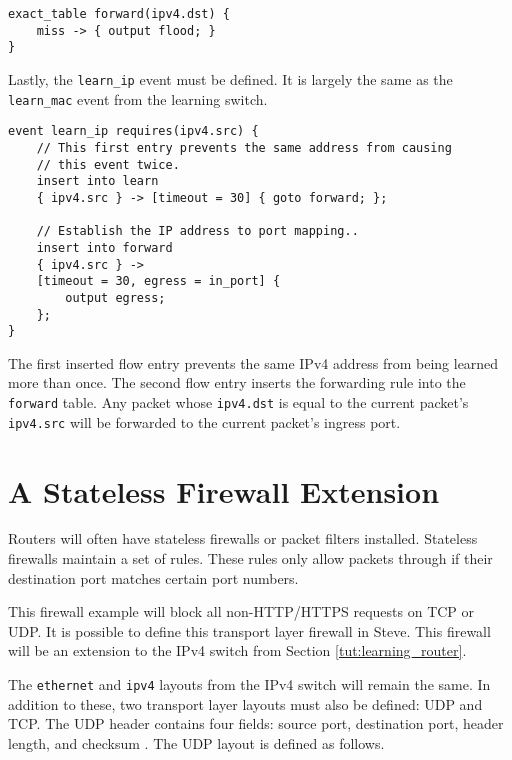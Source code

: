 \begin{codepage}
\begin{lstlisting}
exact_table forward(ipv4.dst) {
	miss -> { output flood; }
}
\end{lstlisting}
\end{codepage}

Lastly, the \texttt{learn\_ip} event must be defined. It is
largely the same as the \texttt{learn\_mac} event from the learning switch.

\begin{codepage}
\begin{lstlisting}
event learn_ip requires(ipv4.src) {
	// This first entry prevents the same address from causing
	// this event twice.
	insert into learn
	{ ipv4.src } -> [timeout = 30] { goto forward; };

	// Establish the IP address to port mapping..
	insert into forward
	{ ipv4.src } ->
	[timeout = 30, egress = in_port] {
		output egress;
	};
}
\end{lstlisting}
\end{codepage}

The first inserted flow entry prevents the same IPv4 address from being learned
more than once. The second flow entry inserts the forwarding rule into the
\texttt{forward} table. Any packet whose \texttt{ipv4.dst} is equal to the current
packet's \texttt{ipv4.src} will be forwarded to the current packet's ingress
port.

\section{A Stateless Firewall Extension} \label{tut:firewall}

Routers will often have stateless firewalls or packet filters installed. 
Stateless firewalls maintain a set of rules. These rules only allow packets 
through if their destination port matches certain port numbers. 

This firewall example will block all non-HTTP/HTTPS requests on TCP or UDP.
It is possible to define this transport layer firewall in Steve. This firewall will be an extension to the IPv4 switch from Section \ref{tut:learning_router}.

The \texttt{ethernet} and \texttt{ipv4} layouts from the IPv4 switch will remain the same. 
In addition to these, two transport layer layouts must also be defined: UDP and TCP.
The UDP header contains four fields: source port, destination port, header length, and checksum \cite{udp_std}. The UDP layout is defined as follows.

